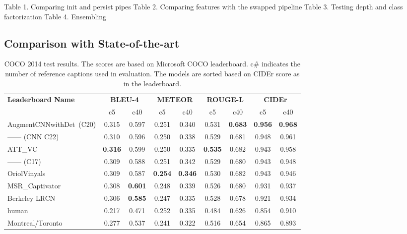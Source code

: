 

Table 1. Comparing init and persist pipes
Table 2. Comparing features with the swapped pipeline 
Table 3. Testing depth and class factorization 
Table 4. Ensembling 

\subsection{Comparison with State-of-the-art}
\begin{table}[htp]
  \newcommand{\mct}[1]{%
    \multicolumn{2}{c|}{\bf#1}}
  \centering
  \begin{adjustbox}{center}
  \begin{tabular}{|l|c|c|c|c|c|c|c|c|}
    \hline\hline
    \multirow{2}{*}{\bf Leaderboard Name}
                       &\mct{BLEU-4} &\mct{METEOR} &\mct{ROUGE-L}&\mct{CIDEr}\\\cline{2-9}
                    & c5    & c40   &  c5   & c40   & c5  &  c40  &  c5  &  c40 \\\hline\hline
    AugmentCNNwithDet~(C20)& 0.315 & 0.597 & 0.251 &0.340& 0.531 &\bf0.683&\bf0.956&\bf0.968\\
    ------ (CNN C22) & 0.310 & 0.596 & 0.250 &0.338& 0.529 & 0.681& 0.948& 0.961\\
    ATT\_VC~\cite{you2016image}& \bf0.316&0.599 & 0.250 &0.335&\bf0.535&0.682& 0.943& 0.958\\
    ------ (C17)  &  0.309 & 0.588 & 0.251 &0.342& 0.529 & 0.680& 0.943& 0.948\\
    OriolVinyals~\cite{Vinyals_2015_CVPR}      & 0.309 & 0.587 &\bf0.254&\bf0.346& 0.530 & 0.682& 0.943& 0.946\\
    MSR\_Captivator~\cite{Fang2015}  & 0.308 &\bf0.601& 0.248 &0.339& 0.526 & 0.680& 0.931& 0.937\\
    Berkeley LRCN~\cite{donahue2015long}   & 0.306 &\bf0.585& 0.247 &0.335& 0.528 & 0.678& 0.921& 0.934\\
    human~\cite{Chen2015}   & 0.217 & 0.471 & 0.252 &0.335& 0.484 & 0.626 & 0.854 & 0.910\\
    Montreal/Toronto~\cite{Xu2015show} & 0.277 & 0.537 & 0.241 &0.322& 0.516 & 0.654 & 0.865 & 0.893\\
    \hline \hline
  \end{tabular}
  \end{adjustbox}
  \caption{COCO 2014 test results. The scores are based on Microsoft
  COCO leaderboard. c\# indicates the number
  of reference captions used in evaluation. The models are sorted
  based on CIDEr score as in the leaderboard.}
  \label{tab:resCocLeaderTest}
\end{table}

